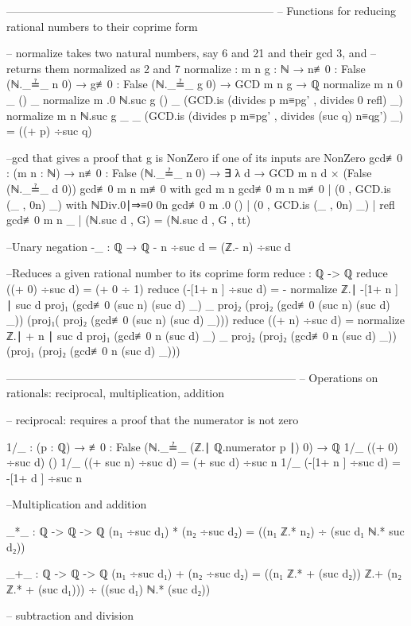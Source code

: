 \documentclass[11pt,a4paper]{article}
\begin{document}
\begin{code}
------------------------------------------------------------------------
--  Functions for reducing rational numbers to their coprime form

-- normalize takes two natural numbers, say 6 and 21 and their gcd 3, and
-- returns them normalized as 2 and 7
normalize : {m n g : ℕ} → 
  {n≢0 : False (ℕ._≟_ n 0)} → {g≢0 : False (ℕ._≟_ g 0)} →
            GCD m n g → ℚ
normalize {m} {n} {0} {_} {()} _
normalize {m} {.0} {ℕ.suc g} {()} {_}
  (GCD.is (divides p m≡pg' , divides 0 refl) _)
normalize {m} {n} {ℕ.suc g} {_} {_}
  (GCD.is (divides p m≡pg' , divides (suc q) n≡qg') _) =
    ((+ p) ÷suc q)

--gcd that gives a proof that g is NonZero if one of its inputs are NonZero
gcd≢0 : (m n : ℕ) → {n≢0 : False (ℕ._≟_ n 0)} → ∃ λ d → 
  GCD m n d × (False (ℕ._≟_ d 0))
gcd≢0 m n {m≢0} with gcd m n
gcd≢0 m n {m≢0} | (0 , GCD.is (_ , 0n) _) with ℕDiv.0∣⇒≡0 0n
gcd≢0 m .0 {()} | (0 , GCD.is (_ , 0n) _) | refl
gcd≢0 m n {_} | (ℕ.suc d , G) = (ℕ.suc d , G , tt)

--Unary negation
-_ : ℚ → ℚ
- n ÷suc d = (ℤ.- n) ÷suc d

--Reduces a given rational number to its coprime form
reduce : ℚ -> ℚ
reduce ((+ 0) ÷suc d) = (+ 0 ÷ 1)
reduce (-[1+ n ] ÷suc d) = 
  - normalize {ℤ.∣ -[1+ n ] ∣} {suc d} {proj₁ (gcd≢0 (suc n) (suc d) {_})} {_}
  {proj₂ (proj₂ (gcd≢0 (suc n) (suc d) {_}))} 
  (proj₁( proj₂ (gcd≢0 (suc n) (suc d) {_})))
reduce ((+ n) ÷suc d) = 
  normalize {ℤ.∣ + n ∣} {suc d} {proj₁ (gcd≢0 n (suc d) {_})} {_} 
  {proj₂ (proj₂ (gcd≢0 n (suc d) {_}))} 
  (proj₁ (proj₂ (gcd≢0 n (suc d) {_})))

------------------------------------------------------------------------------
-- Operations on rationals: reciprocal, multiplication, addition

-- reciprocal: requires a proof that the numerator is not zero

1/_ : (p : ℚ) → {≢0 : False (ℕ._≟_ (ℤ.∣ ℚ.numerator p ∣) 0)} → ℚ
1/_ ((+ 0) ÷suc d) {()}
1/_ ((+ suc n) ÷suc d) = (+ suc d) ÷suc n
1/_ (-[1+ n ] ÷suc d) = -[1+ d ] ÷suc n

--Multiplication and addition

_*_ : ℚ -> ℚ -> ℚ
(n₁ ÷suc d₁) * (n₂ ÷suc d₂) = ((n₁ ℤ.* n₂) ÷ (suc d₁ ℕ.* suc d₂))

_+_ :  ℚ -> ℚ -> ℚ
(n₁ ÷suc d₁) + (n₂ ÷suc d₂) =  ((n₁ ℤ.* + (suc d₂)) ℤ.+ (n₂ ℤ.* + (suc  d₁))) 
  ÷ ((suc d₁) ℕ.* (suc d₂))

 -- subtraction and division


\end{code}
\end{document}
